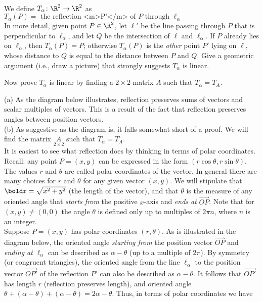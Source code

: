 \\
We define $T_{\alpha}\colon\R^2\rightarrow \R^2$ as 
$
T_\alpha(P)=\text{ the reflection <m>P'</m> of $P$ through $\ell_\alpha$}
$
\\
In more detail, given point $P\in\R^2$, let $\ell'$ be the line passing through $P$ that is perpendicular to $\ell_{\alpha}$, and let $Q$ be the intersection of $\ell$ and $\ell_\alpha$. If $P$ already lies on $\ell_{\alpha}$, then $T_\alpha(P)=P$; otherwise $T_\alpha(P)$ is the {\em other} point $P'$ lying on $\ell$, whose distance to $Q$ is equal to the distance between $P$ and $Q$. 
\bb
\ii Give a geometric argument (i.e., draw a picture) that strongly suggests $T_\alpha$ is linear. 

\ii Now prove $T_\alpha$ is linear by finding a $2\times 2$ matrix $A$ such that $T_\alpha=T_A$.
\ee
\begin{solution}
\noindent
(a) As the diagram below illustrates, reflection preserves sums of vectors and scalar multiples of vectors. This is a result of the fact that reflection preserves angles between position vectors. 
\\
(b) As suggestive as the diagram is, it falls somewhat short of a proof. We will find the matrix $\underset{2\times 2}{A}$ such that $T_{\alpha}=T_A$. 
\vspace{.1in}
\\
It is easiest to see what reflection does by thinking in terms of polar coordinates. Recall: any point $P=(x,y)$ can be expressed in the form $(r\cos\theta, r\sin\theta)$.  The values $r$ and $\theta$ are called polar coordinates of the vector. In general there are many choices for $r$ and $\theta$ for any given vector $(x,y)$. We will stipulate that $\boldr=\sqrt{x^2+y^2}$ (the length of the vector), and that $\theta$ is the measure of any oriented angle that {\em starts from} the positive $x$-axis and {\em ends at} $\overrightarrow{OP}$. Note that for $(x,y)\ne (0,0)$ the angle $\theta$ is defined only up to multiples of $2\pi n$, where $n$ is an integer.  
\\
Suppose $P=(x,y)$ has polar coordinates $(r,\theta)$. As is illustrated in the diagram below, the oriented angle {\em starting from} the position vector $\overrightarrow{OP}$ and {\em ending at} $\ell_\alpha$ can be described as $\alpha-\theta$ (up to a multiple of $2\pi$). By symmetry (or congruent triangles), the oriented angle from the line $\ell_\alpha$ to the position vector $\overrightarrow{OP'}$ of the reflection $P'$ can also be described as $\alpha-\theta$.  It follows that $\overrightarrow{OP'}$ has length $r$ (reflection preserves length), and oriented angle $\theta+(\alpha-\theta)+(\alpha-\theta)=2\alpha-\theta$. Thus, in terms of polar coordinates we have 

\end{solution}
